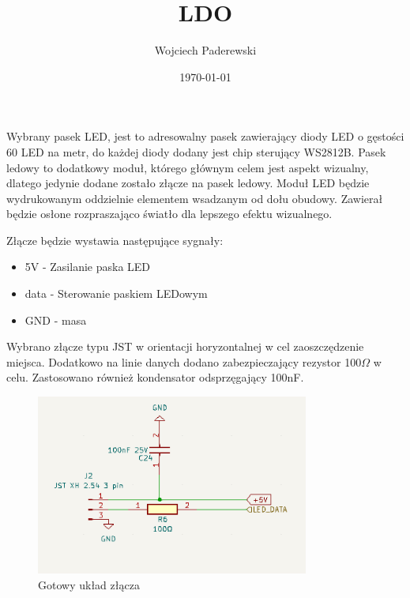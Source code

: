\documentclass[../../main.tex]{subfiles}
\author{Wojciech Paderewski}
\date{\today}
\title{LDO}
\begin{document}
Wybrany pasek LED, jest to adresowalny pasek zawierający diody LED o gęstości 60 LED na metr, do każdej diody dodany jest chip sterujący WS2812B.
Pasek ledowy to dodatkowy moduł, którego głównym celem jest aspekt wizualny, dlatego jedynie dodane zostało złącze na pasek ledowy.
Moduł LED będzie wydrukowanym oddzielnie elementem wsadzanym od dołu obudowy. Zawierał będzie osłone rozpraszająco światło dla lepszego
efektu wizualnego.

Złącze będzie wystawia następujące sygnały:
\begin{itemize}
    \item 5V - Zasilanie paska LED
    \item data - Sterowanie paskiem LEDowym
    \item GND - masa
\end{itemize}

Wybrano złącze typu JST w orientacji horyzontalnej w cel zaoszczędzenie miejsca. Dodatkowo na linie danych dodano zabezpieczający rezystor 100$\Omega$ w celu.
Zastosowano również kondensator odsprzęgający 100nF.

\begin{figure}[H]
    \centering
    \includegraphics[width=0.8\textwidth]{LED.png}
    \caption{Gotowy układ złącza}
\end{figure}
\end{document}
